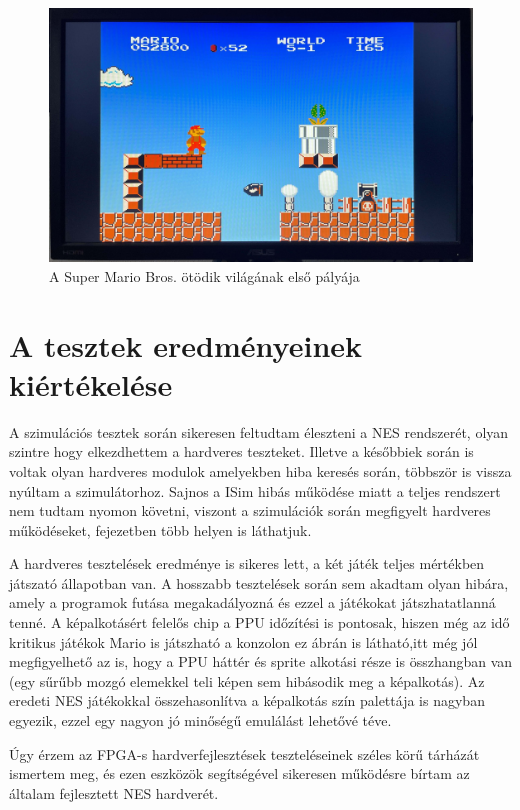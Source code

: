 \begin{figure}[H]
	\centering
	\includegraphics[width=150mm, keepaspectratio]{figures/Super-Mario-world5-1-croped}
	\caption{A Super Mario Bros. ötödik világának első pályája} 
	\label{fig:Super-Mario-world5-1}
\end{figure}

\section{A tesztek eredményeinek kiértékelése}

A szimulációs tesztek során sikeresen feltudtam éleszteni a NES rendszerét, olyan szintre hogy elkezdhettem a hardveres teszteket. Illetve a későbbiek során is voltak olyan hardveres modulok amelyekben  hiba keresés során, többször is vissza nyúltam a szimulátorhoz. Sajnos a ISim hibás működése miatt a teljes rendszert nem tudtam nyomon követni, viszont a szimulációk során megfigyelt hardveres működéseket,  fejezetben több helyen is láthatjuk.

A hardveres tesztelések eredménye is sikeres lett, a két játék teljes mértékben játszató állapotban van. A hosszabb tesztelések során sem akadtam olyan hibára, amely a programok futása megakadályozná és ezzel a játékokat játszhatatlanná tenné. A képalkotásért felelős chip a PPU időzítési is pontosak, hiszen még az idő kritikus játékok Mario is játszható a konzolon ez  ábrán is látható,itt még jól megfigyelhető az is, hogy a PPU háttér és sprite alkotási része is összhangban van (egy sűrűbb mozgó elemekkel teli képen sem hibásodik meg a képalkotás). Az eredeti NES játékokkal összehasonlítva a képalkotás szín palettája is nagyban egyezik, ezzel egy nagyon jó minőségű emulálást lehetővé téve.

Úgy érzem az FPGA-s hardverfejlesztések teszteléseinek széles körű tárházát ismertem meg, és ezen eszközök segítségével sikeresen működésre bírtam az általam fejlesztett NES hardverét.